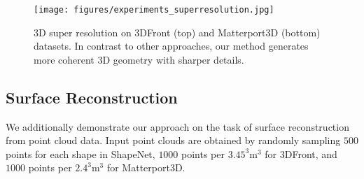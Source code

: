 \begin{figure*}
	\centering
	\texttt{[image: figures/experiments\_superresolution.jpg]}
    \vspace{-0.6cm}
	\caption{
	    3D super resolution on 3DFront (top) and Matterport3D (bottom) datasets. In contrast to other approaches, our method generates more coherent 3D geometry with sharper details.
    }
	\label{fig:experiments_superresolution}
	\vspace{-0.25cm}
\end{figure*}

\subsection{Surface Reconstruction}
We additionally demonstrate our approach on the task of surface reconstruction from point cloud data.
%
Input point clouds are obtained by randomly sampling $500$ points for each shape in ShapeNet, $1000$ points per $3.45^3\mathrm{m}^3$ for 3DFront, and $1000$ points per $2.4^3\mathrm{m}^3$ for Matterport3D.
%

